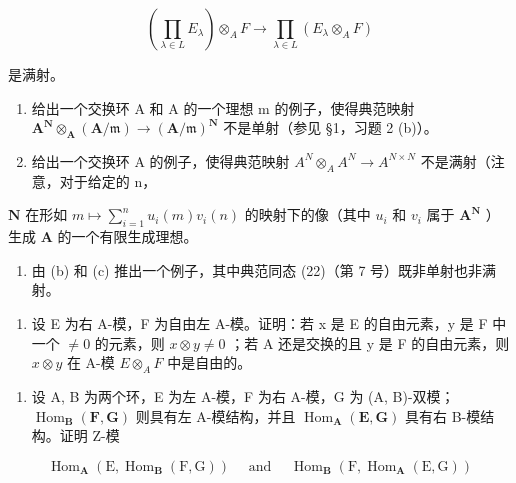 \[
\left(\prod_ {\lambda \in L} E _ {\lambda}\right) \otimes_ {A} F \rightarrow \prod_ {\lambda \in L} (E _ {\lambda} \otimes_ {A} F)
\]

是满射。

\begin{enumerate}
\def\labelenumi{(\alph{enumi})}
\setcounter{enumi}{1}
\item
  给出一个交换环 A 和 A 的一个理想 m 的例子，使得典范映射 \(\mathbf{A}^{\mathbf{N}}\otimes_{\mathbf{A}}(\mathbf{A}/\mathfrak{m})\to(\mathbf{A}/\mathfrak{m})^{\mathbf{N}}\) 不是单射（参见 §1，习题 2 (b)）。
\item
  给出一个交换环 A 的例子，使得典范映射 \(A^{N} \otimes_{A} A^{N} \to A^{N \times N}\) 不是满射（注意，对于给定的 n，
\end{enumerate}

\(\mathbf{N}\) 在形如 \(m \mapsto \sum_{i=1}^{n} u_i(m)v_i(n)\) 的映射下的像（其中 \(u_i\) 和 \(v_i\) 属于 \(\mathbf{A}^{\mathbf{N}}\) ）生成 \(\mathbf{A}\) 的一个有限生成理想。

\begin{enumerate}
\def\labelenumi{(\alph{enumi})}
\setcounter{enumi}{3}
\tightlist
\item
  由 (b) 和 (c) 推出一个例子，其中典范同态 (22)（第 7 号）既非单射也非满射。
\end{enumerate}

\begin{enumerate}
\def\labelenumi{\arabic{enumi}.}
\setcounter{enumi}{3}
\tightlist
\item
  设 E 为右 A-模，F 为自由左 A-模。证明：若 x 是 E 的自由元素，y 是 F 中一个 \(\neq0\) 的元素，则 \(x\otimes y\neq0\) ；若 A 还是交换的且 y 是 F 的自由元素，则 \(x\otimes y\) 在 A-模 \(E\otimes_{A}F\) 中是自由的。
\end{enumerate}

\BourbakiExercisesSection

\begin{enumerate}
\def\labelenumi{\arabic{enumi}.}
\tightlist
\item
  设 A, B 为两个环，E 为左 A-模，F 为右 A-模，G 为 (A, B)-双模； \(\operatorname{Hom}_{\mathbf{B}}(\mathbf{F}, \mathbf{G})\) 则具有左 A-模结构，并且 \(\operatorname{Hom}_{\mathbf{A}}(\mathbf{E}, \mathbf{G})\) 具有右 B-模结构。证明 Z-模
\end{enumerate}

\[
\operatorname{Hom} _ {\mathbf {A}} (\mathrm{E}, \operatorname{Hom} _ {\mathbf {B}} (\mathrm{F}, \mathrm{G})) \quad \text { and } \quad \operatorname{Hom} _ {\mathbf {B}} (\mathrm{F}, \operatorname{Hom} _ {\mathbf {A}} (\mathrm{E}, \mathrm{G}))
\]

